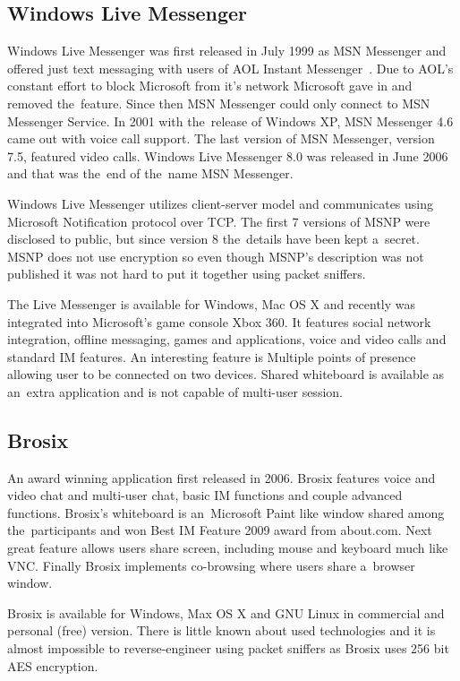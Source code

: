 \subsection*{Windows Live Messenger}
Windows Live Messenger was first released in July 1999 as MSN Messenger and offered just text messaging with users of AOL Instant Messenger~\cite{AIM}. Due to AOL's constant effort to block Microsoft from it's network Microsoft gave in and removed the~feature. Since then MSN Messenger could only connect to MSN Messenger Service. In 2001 with the~release of Windows XP, MSN Messenger 4.6 came out with voice call support. The last version of MSN Messenger, version 7.5, featured video calls. Windows Live Messenger 8.0 was released in June 2006 and that was the~end of the~name MSN Messenger.   

Windows Live Messenger utilizes client-server model and communicates using Microsoft Notification protocol over TCP. The first 7 versions of MSNP were disclosed to public, but since version 8 the~details have been kept a~secret. MSNP does not use encryption so even though MSNP's description was not published it was not hard to put it together using packet sniffers.

The Live Messenger is available for Windows, Mac OS X and recently was integrated into Microsoft's game console Xbox 360. It features social network integration, offline messaging, games and applications, voice and video calls and standard IM features. An interesting feature is Multiple points of presence allowing user to be connected on two devices. Shared whiteboard is available as an~extra application and is not capable of multi-user session.   

\subsection*{Brosix}
An award winning application first released in 2006. Brosix features voice and video chat and multi-user chat, basic IM functions and couple advanced functions. Brosix's whiteboard is an~Microsoft Paint like window shared among the~participants and won Best IM Feature 2009 award from about.com. Next great feature allows users share screen, including mouse and keyboard much like VNC. Finally Brosix implements co-browsing where users share a~browser window. 

Brosix is available for Windows, Max OS X and GNU Linux in commercial and personal (free) version. There is little known about used technologies and it is almost impossible to reverse-engineer using packet sniffers as Brosix uses 256 bit AES encryption.

